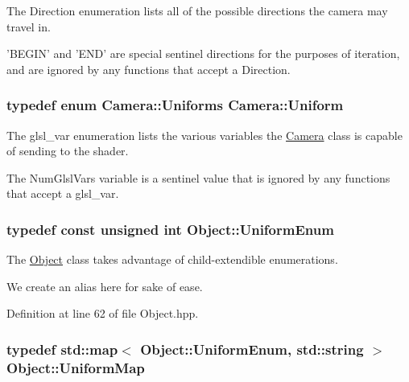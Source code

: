 The Direction enumeration lists all of the possible directions the camera may travel in. 

'B\-E\-G\-I\-N' and 'E\-N\-D' are special sentinel directions for the purposes of iteration, and are ignored by any functions that accept a Direction. \hypertarget{class_camera_a0ed19c96505cbb70625938d1e883af24}{
\subsubsection[{Uniform}]{\setlength{\rightskip}{0pt plus 5cm}typedef enum {\bf Camera\-::\-Uniforms}  {\bf Camera\-::\-Uniform}}}\label{class_camera_a0ed19c96505cbb70625938d1e883af24}


The glsl\-\_\-var enumeration lists the various variables the \hyperlink{class_camera}{Camera} class is capable of sending to the shader. 

The Num\-Glsl\-Vars variable is a sentinel value that is ignored by any functions that accept a glsl\-\_\-var. \hypertarget{class_object_a79b74057dbc5182b85c9c3ba8480fcf2}{
\subsubsection[{Uniform\-Enum}]{\setlength{\rightskip}{0pt plus 5cm}typedef const unsigned int {\bf Object\-::\-Uniform\-Enum}\hspace{0.3cm}{\ttfamily [inherited]}}}\label{class_object_a79b74057dbc5182b85c9c3ba8480fcf2}


The \hyperlink{class_object}{Object} class takes advantage of child-\/extendible enumerations. 

We create an alias here for sake of ease. 

Definition at line 62 of file Object.\-hpp.

\hypertarget{class_object_a6e19bd8516360bff956408cbae33b878}{
\subsubsection[{Uniform\-Map}]{\setlength{\rightskip}{0pt plus 5cm}typedef std\-::map$<$ {\bf Object\-::\-Uniform\-Enum}, std\-::string $>$ {\bf Object\-::\-Uniform\-Map}\hspace{0.3cm}{\ttfamily [inherited]}}}\label{class_object_a6e19bd8516360bff956408cbae33b878}



